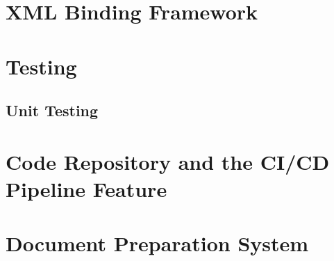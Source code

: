 \section{XML Binding Framework}
\lipsum[10-11]
\section{Testing}
\lipsum[7-8]
\subsection{Unit Testing}
\lipsum[5-6]
\newpage
\section{Code Repository and the CI/CD Pipeline Feature}
\label{sec:GitLab}
\lipsum[7-8]	
\section{Document Preparation System}
\lipsum[10-11]